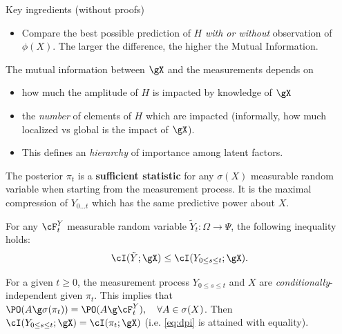 \begin{frame}[allowframebreaks]{Key ingredients (without proofs)}
\begin{theorem}
\end{theorem}
\begin{itemize}
    \item Compare the best possible prediction of $H$ \textit{with or without} observation of $\phi(X)$. The larger the difference, the higher the Mutual Information.
\end{itemize} 
\framebreak
The mutual information between $\gX$ and the measurements depends on
\begin{itemize}
    \item   how much the amplitude of $H$ is impacted by knowledge of $\gX$ 
    \item the \textit{number} of elements of $H$ which are impacted (informally, how much localized vs global is the impact of $\gX$).
   \item This defines an \textit{hierarchy} of importance among latent factors.
\end{itemize}
\framebreak

The posterior $\pi_t$ is a \textbf{sufficient statistic} for any $\sigma(X)$ measurable random variable when starting from the measurement process. It is the maximal compression of $Y_{0\dots t}$ which has the same predictive power about $X$.

\begin{Theorem}\label{sufficient_statistic}
For any $\cF^Y_t$ measurable random variable $\tilde{Y}_t:\Omega\rightarrow \Psi$, the following inequality holds:
\begin{equation}\label{eq:dpi}
    \cI(\tilde{Y};\gX)\leq \cI(Y_{0\leq s\leq t};\gX).
\end{equation}

For a given $t\geq 0$, the measurement process $Y_{0\leq s\leq t}$ and $X$ are \textit{conditionally}-independent given $\pi_t$. This implies that $\PO(A\g \sigma(\pi_t))=\PO(A\g \cF^Y_t),\quad \forall A\in\sigma(X)$. Then
$\cI(Y_{0\leq s\leq t};\gX)=\cI(\pi_t;\gX)$ (i.e. \ref{eq:dpi} is attained with equality).
\end{Theorem}






\end{frame}


